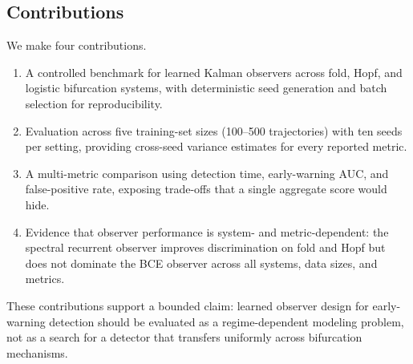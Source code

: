 \subsection{Contributions}
\label{sec:contributions}

We make four contributions.

\begin{enumerate}[leftmargin=*]
  \item A controlled benchmark for learned Kalman observers across fold,
        Hopf, and logistic bifurcation systems, with deterministic seed
        generation and batch selection for reproducibility.
  \item Evaluation across five training-set sizes (100--500 trajectories)
        with ten seeds per setting, providing cross-seed variance estimates
        for every reported metric.
  \item A multi-metric comparison using detection time, early-warning AUC,
        and false-positive rate, exposing trade-offs that a single aggregate
        score would hide.
  \item Evidence that observer performance is system- and metric-dependent:
        the spectral recurrent observer improves discrimination on fold and
        Hopf but does not dominate the BCE observer across all systems,
        data sizes, and metrics.
\end{enumerate}

These contributions support a bounded claim: learned observer design for
early-warning detection should be evaluated as a regime-dependent modeling
problem, not as a search for a detector that transfers uniformly across
bifurcation mechanisms.
